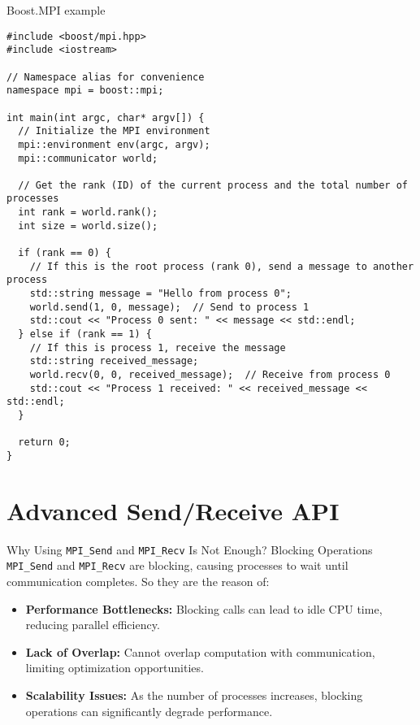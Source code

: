 \documentclass{beamer}
\begin{document}
\begin{frame}[fragile]{Boost.MPI example}
  \lstset{style=CStyle, caption=Hello World example with Boost MPI}
  \begin{lstlisting}
#include <boost/mpi.hpp>
#include <iostream>

// Namespace alias for convenience
namespace mpi = boost::mpi;

int main(int argc, char* argv[]) {
  // Initialize the MPI environment
  mpi::environment env(argc, argv);
  mpi::communicator world;

  // Get the rank (ID) of the current process and the total number of processes
  int rank = world.rank();
  int size = world.size();

  if (rank == 0) {
    // If this is the root process (rank 0), send a message to another process
    std::string message = "Hello from process 0";
    world.send(1, 0, message);  // Send to process 1
    std::cout << "Process 0 sent: " << message << std::endl;
  } else if (rank == 1) {
    // If this is process 1, receive the message
    std::string received_message;
    world.recv(0, 0, received_message);  // Receive from process 0
    std::cout << "Process 1 received: " << received_message << std::endl;
  }

  return 0;
}
  \end{lstlisting}
\end{frame}

\section{Advanced Send/Receive API}

\begin{frame}{Why Using \texttt{MPI\_Send} and \texttt{MPI\_Recv} Is Not Enough?}
  Blocking Operations \texttt{MPI\_Send} and \texttt{MPI\_Recv} are blocking, causing processes to wait until communication completes.
  So they are the reason of:
  \begin{itemize}
    \item \textbf{Performance Bottlenecks:} Blocking calls can lead to idle CPU time, reducing parallel efficiency.
    \item \textbf{Lack of Overlap:} Cannot overlap computation with communication, limiting optimization opportunities.
    \item \textbf{Scalability Issues:} As the number of processes increases, blocking operations can significantly degrade performance.
  \end{itemize}
\end{frame}
\end{document}
